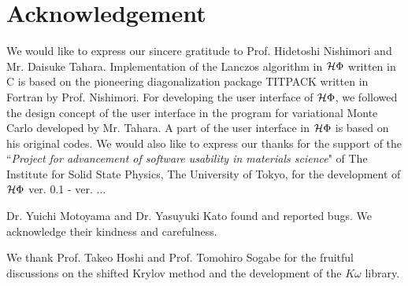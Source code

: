\chapter{Acknowledgement}
We would like to express our sincere gratitude to Prof. Hidetoshi Nishimori and Mr. Daisuke Tahara.
Implementation of the Lanczos algorithm in $\mathcal{H} \Phi$ written in C is based on the
pioneering diagonalization package TITPACK written in Fortran by Prof. Nishimori.
For developing the user interface of $\mathcal{H} \Phi$, we followed the design concept of
the user interface in the program for variational Monte Carlo developed by Mr. Tahara.
A part of the user interface in $\mathcal{H} \Phi$ is based on his original codes.
We would also like to express our thanks for the support of the ``{\it Project for advancement of software usability in materials science}" 
of The Institute for Solid State Physics, The University of Tokyo, for the development of $\mathcal{H} \Phi$ ver. 0.1 - ver. ...
    

Dr. Yuichi Motoyama and Dr. Yasuyuki Kato found and reported bugs.
We acknowledge their kindness and carefulness.

We thank Prof. Takeo Hoshi and Prof. Tomohiro Sogabe for the fruitful discussions on the shifted Krylov method and the development of the $K\omega$ library.

